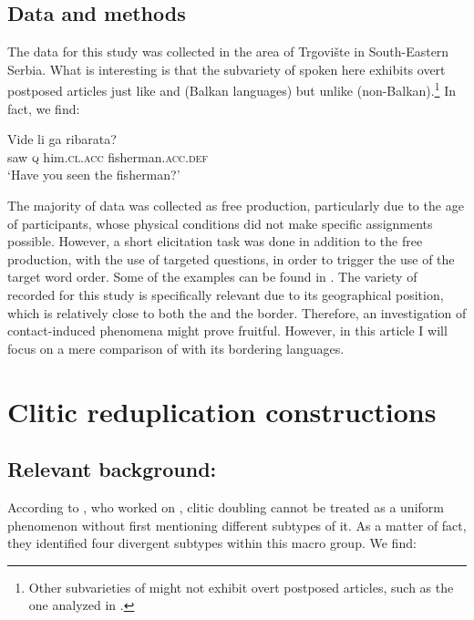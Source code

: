\documentclass[output=paper,
colorlinks,
citecolor=brown,
newtxmath
]{langscibook}
\begin{document}
\subsection{Data and methods}
\label{sec:dataandmethods}
The data for this study was collected in the area of Trgovište in South-Eastern Serbia. What is interesting is that the subvariety of  spoken here exhibits overt postposed articles just like  and  (Balkan languages) but unlike  (non-Balkan).\footnote{Other subvarieties of  might not exhibit overt postposed articles, such as the one analyzed in \citet{Runic2013,Runic2014}.} In fact, we find:


\ea\label{ex:zivojinovic:5}
\gll Vide li  ga         ribarata?\\
     saw  \textsc{q}   him.\textsc{cl.acc} fisherman.\textsc{acc.def}\\
\glt `Have you seen the fisherman?'
\z

\noindent The majority of data was collected as free production, particularly due to the age of participants, whose physical conditions did not make specific assignments possible. However, a short elicitation task was done in addition to the free production, with the use of targeted questions, in order to trigger the use of the target word order. Some of the examples can be found in . The variety of  recorded for this study is specifically relevant due to its geographical position, which is relatively close to both the  and the  border. Therefore, an investigation of contact-induced phenomena might prove fruitful. However, in this article I will focus on a mere comparison of  with its bordering languages.
%
%

\section{Clitic reduplication constructions}
\label{sec:reduplications}

\subsection{Relevant background: \citet{Cinque.Krapova2008}}
\label{subsec:relevantbackground}
According to \citet{Cinque.Krapova2008}, who worked on , clitic doubling cannot be treated as a uniform phenomenon without first mentioning different subtypes of it. As a matter of fact, they identified four divergent subtypes within this macro group. We find:
\end{document}
